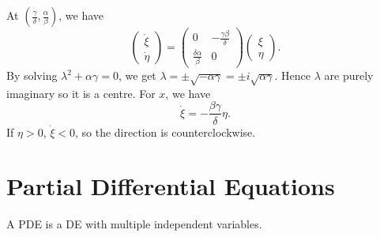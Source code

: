 \documentclass[10pt]{article}
\begin{document}
\begin{example}
        At $ (\frac{\gamma}{\delta},\frac{\alpha}{\beta}) $, we have 
        \[
            \begin{pmatrix}
                \dot{\xi}\\\dot{\eta}
            \end{pmatrix} = \begin{pmatrix}
                0&-\frac{\gamma \beta}{\delta}\\
                \frac{\delta \alpha}{\beta}&0
            \end{pmatrix}\begin{pmatrix}
                \xi\\\eta
            \end{pmatrix}.
        \]
        By solving $ \lambda^2+\alpha \gamma=0 $, we get $ \lambda=\pm \sqrt{-\alpha\gamma}=\pm i \sqrt{\alpha\gamma} $. Hence $ \lambda $ are purely imaginary so it is a centre. For $x$, we have 
        \[
            \dot{\xi}=-\frac{\beta \gamma}{\delta}\eta.
        \]
        If $ \eta>0 $, $ \dot{\xi}<0 $, so the direction is counterclockwise.
    \end{example}
    \part{Partial Differential Equations}
    \begin{definition}
        A PDE is a DE with multiple independent variables.
    \end{definition}
\end{document}
